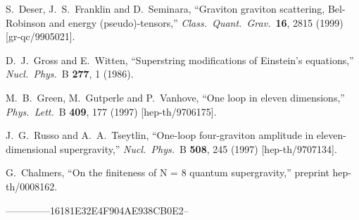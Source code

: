 \begin{thebibliography}{99}
S.~Deser, J.~S.~Franklin and D.~Seminara,
``Graviton graviton scattering, Bel-Robinson and energy (pseudo)-tensors,''
{\it Class.\ Quant.\ Grav.}\  {\bf 16}, 2815 (1999)
[gr-qc/9905021].

D.~J.~Gross and E.~Witten,
``Superstring modifications of Einstein's equations,''
{\it Nucl.\ Phys.}\ B {\bf 277}, 1 (1986).

M.~B.~Green, M.~Gutperle and P.~Vanhove,
``One loop in eleven dimensions,''
{\it Phys.\ Lett.}\ B {\bf 409}, 177 (1997)
[hep-th/9706175].

J.~G.~Russo and A.~A.~Tseytlin,
``One-loop four-graviton amplitude in eleven-dimensional supergravity,''
{\it Nucl.\ Phys.}\ B {\bf 508}, 245 (1997)
[hep-th/9707134].

G.~Chalmers,
``On the finiteness of N = 8 quantum supergravity,''
preprint hep-th/0008162.

\end{thebibliography}







--------------16181E32E4F904AE938CB0E2--


